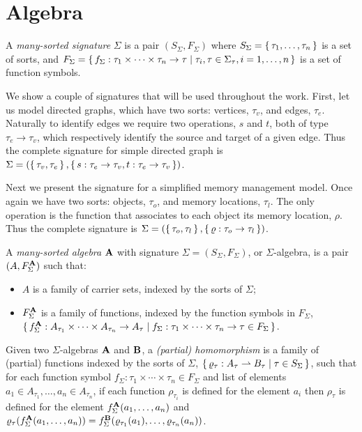 \section{Algebra}\label{sec:algebra}

\begin{definition}
  A \emph{many-sorted signature} $\Sigma$ is a pair $(S_\Sigma, F_\Sigma)$ where $S_\Sigma = \set{\tau_1, \ldots,
  \tau_n}$ is a set of sorts, and $F_\Sigma = \set{f_\Sigma : \tau_1 \times \cdots \times \tau_n \to \tau | \tau_i, \tau
  \in \Sigma_\tau, i = 1, \ldots, n}$ is a set of function symbols.
\end{definition}

We show a couple of signatures that will be used throughout the work. First, let us model directed graphs, which
have two sorts: vertices, $\tau_v$, and edges, $\tau_e$. Naturally to identify edges we require two operations, $s$ and $t$,
both of type $\tau_e \to \tau_v$, which respectively identify the source and target of a given edge. Thus the complete
signature for simple directed graph is $\Sigma = (\set{\tau_v, \tau_e}, \set{s : \tau_e \to \tau_v, t : \tau_e \to
\tau_v})$.

Next we present the signature for a simplified memory management model. Once again we have two sorts: objects, $\tau_o$, and
memory locations, $\tau_l$. The only operation is the function that associates to each object its memory location,
$\rho$. Thus the complete signature is $\Sigma = (\set{\tau_o, \tau_l}, \set{\varrho: \tau_o \to \tau_l})$.

\begin{definition}
  A \emph{many-sorted algebra} $\mathbf{A}$ with signature $\Sigma = (S_\Sigma, F_\Sigma)$, or $\Sigma$-algebra, is a
  pair $(A, F_\Sigma^{\mathbf{A}})$ such that:
  \begin{itemize}
    \item $A$ is a family of carrier sets, indexed by the sorts of $\Sigma$;
    \item $F_\Sigma^{\mathbf{A}}$ is a family of functions, indexed by the function symbols in $F_\Sigma$,
      $\set{f_\Sigma^{\mathbf{A}} : A_{\tau_1} \times \cdots \times A_{\tau_n} \to A_\tau | f_\Sigma : \tau_1 \times
      \cdots \times \tau_n \to \tau \in F_\Sigma}$.
  \end{itemize}
\end{definition}

\begin{definition}[Homomorphism]
  Given two $\Sigma$-algebras $\mathbf{A}$ and $\mathbf{B}$, a \emph{(partial)
  homomorphism} is a family of (partial) functions indexed by the sorts of $\Sigma$, $\set{\varrho_\tau : A_\tau
  \rightharpoonup B_\tau | \tau \in S_\Sigma}$, such that for each function symbol $f_\Sigma : \tau_1 \times \cdots \times
  \tau_n \in F_\Sigma$ and list of elements $a_1 \in A_{\tau_1}, \ldots, a_n \in A_{\tau_n}$, if each function
  $\rho_{\tau_i}$ is defined for the element $a_i$ then $\rho_\tau$ is defined for the element $f_\Sigma^{\mathbf{A}}(a_1,
  \ldots, a_n)$ and $\varrho_\tau(f_\Sigma^{\mathbf{A}}(a_1, \ldots, a_n)) = f_\Sigma^{\mathbf{B}}(\varrho_{\tau_1}(a_1),
  \ldots, \varrho_{\tau_n}(a_n))$.
\end{definition}

